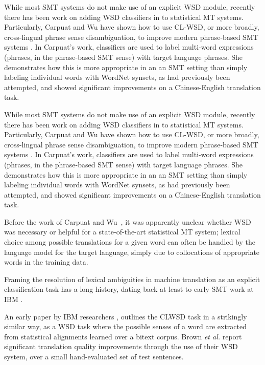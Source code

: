 While most SMT systems do not make use of an explicit WSD module, recently
there has been work on adding WSD classifiers in to statistical MT systems.
Particularly, Carpuat and Wu have shown how to use CL-WSD, or more broadly,
cross-lingual phrase sense disambiguation, to improve modern phrase-based SMT
systems
\cite{carpuatpsd,carpuat-wu:2007:EMNLP-CoNLL2007,carpuat2008evaluation}. In
Carpuat's work, classifiers are used to label multi-word expressions (phrases,
in the phrase-based SMT sense) with target language phrases. She demonstrates
how this is more appropriate in an an SMT setting than simply labeling
individual words with WordNet synsets, as had previously been attempted, and
showed significant improvements on a Chinese-English translation task.

While most SMT systems do not make use of an explicit WSD module, recently
there has been work on adding WSD classifiers in to statistical MT systems.
Particularly, Carpuat and Wu have shown how to use CL-WSD, or more broadly,
cross-lingual phrase sense disambiguation, to improve modern phrase-based SMT
systems
\cite{carpuatpsd,carpuat-wu:2007:EMNLP-CoNLL2007,carpuat2008evaluation}. In
Carpuat's work, classifiers are used to label multi-word expressions (phrases,
in the phrase-based SMT sense) with target language phrases. She demonstrates
how this is more appropriate in an an SMT setting than simply labeling
individual words with WordNet synsets, as had previously been attempted, and
showed significant improvements on a Chinese-English translation task.

Before the work of Carpuat and Wu~\cite{improvingsmtwsd}, it was apparently
unclear whether WSD was necessary or helpful for a state-of-the-art statistical
MT system; lexical choice among possible translations for a given word can
often be handled by the language model for the target language, simply due to
collocations of appropriate words in the training data.


Framing the resolution of lexical ambiguities in machine translation
as an explicit classification
task has a long history, dating back at least to early SMT work at IBM
\cite{Brown91word-sensedisambiguation}.

An early paper by IBM researchers \cite{Brown91word-sensedisambiguation},
outlines the CLWSD task in a strikingly similar way, as a WSD task where the
possible senses of a word are extracted from statistical alignments learned
over a bitext corpus. Brown \textit{et al.} report significant translation
quality improvements through the use of their WSD system, over a small
hand-evaluated set of test sentences.





